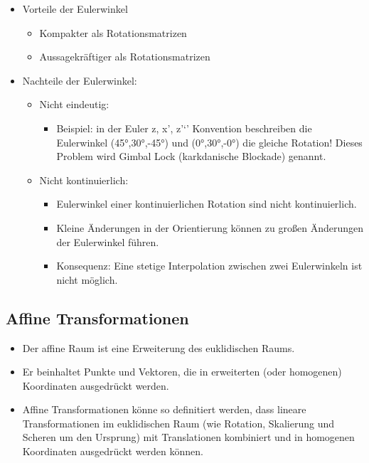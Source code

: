 \documentclass[paper=a4, fontsize=11pt]{scrartcl} %
\numberwithin{equation}{section} %
\numberwithin{figure}{section} %
\numberwithin{table}{section} %
\begin{document}
\begin{itemize}
\item Vorteile der Eulerwinkel
\begin{itemize}
\item Kompakter als Rotationsmatrizen
\item Aussagekräftiger als Rotationsmatrizen
\end{itemize}
\item Nachteile der Eulerwinkel:
\begin{itemize}
\item Nicht eindeutig:
\begin{itemize}
\item Beispiel: in der Euler z, x', z'`' Konvention beschreiben die Eulerwinkel (45°,30°,-45°) und (0°,30°,-0°) die gleiche Rotation! Dieses Problem wird Gimbal Lock (karkdanische Blockade) genannt.
\end{itemize}
\item Nicht kontinuierlich:
\begin{itemize}
\item Eulerwinkel einer kontinuierlichen Rotation sind nicht kontinuierlich.
\item Kleine Änderungen in der Orientierung können zu großen Änderungen der Eulerwinkel führen.
\item Konsequenz: Eine stetige Interpolation zwischen zwei Eulerwinkeln ist nicht möglich.
\end{itemize}
\end{itemize}
\end{itemize}

\subsection{Affine Transformationen}

\begin{itemize}
\item Der affine Raum ist eine Erweiterung des euklidischen Raums.
\item Er beinhaltet Punkte und Vektoren, die in erweiterten (oder homogenen) Koordinaten ausgedrückt werden.
\item Affine Transformationen könne so definitiert werden, dass lineare Transformationen im euklidischen Raum (wie Rotation, Skalierung und Scheren um den Ursprung) mit Translationen kombiniert und in homogenen Koordinaten ausgedrückt werden können.
\end{itemize}
\end{document}
